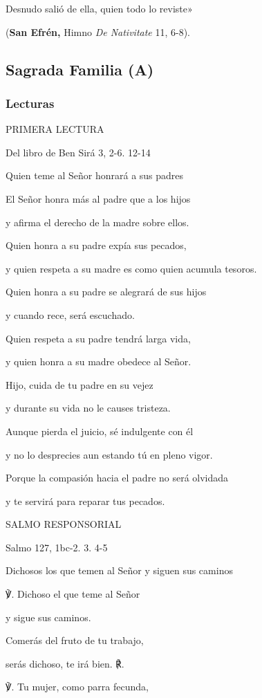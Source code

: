 \documentclass[]{article}
\begin{document}
Desnudo salió de ella, quien todo lo reviste»

(\textbf{San Efrén,} Himno \emph{De Nativitate} 11, 6-8).

\subsection{Sagrada Familia (A)}\label{sagrada-familia-a}

\subsubsection{Lecturas}\label{lecturas-8}

PRIMERA LECTURA

Del libro de Ben Sirá 3, 2-6. 12-14

Quien teme al Señor honrará a sus padres

El Señor honra más al padre que a los hijos

y afirma el derecho de la madre sobre ellos.

Quien honra a su padre expía sus pecados,

y quien respeta a su madre es como quien acumula tesoros.

Quien honra a su padre se alegrará de sus hijos

y cuando rece, será escuchado.

Quien respeta a su padre tendrá larga vida,

y quien honra a su madre obedece al Señor.

Hijo, cuida de tu padre en su vejez

y durante su vida no le causes tristeza.

Aunque pierda el juicio, sé indulgente con él

y no lo desprecies aun estando tú en pleno vigor.

Porque la compasión hacia el padre no será olvidada

y te servirá para reparar tus pecados.

SALMO RESPONSORIAL

Salmo 127, 1bc-2. 3. 4-5

Dichosos los que temen al Señor y siguen sus caminos

℣. Dichoso el que teme al Señor

y sigue sus caminos.

Comerás del fruto de tu trabajo,

serás dichoso, te irá bien. ℟.

℣. Tu mujer, como parra fecunda,
\end{document}

